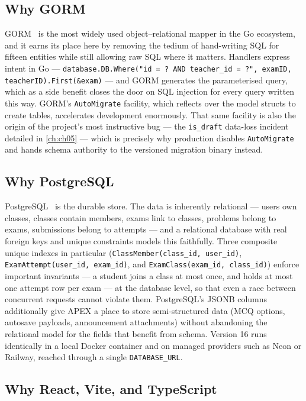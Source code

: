 \subsection{Why GORM}

GORM~\cite{gorm} is the most widely used object--relational mapper in the Go
ecosystem, and it earns its place here by removing the tedium of hand-writing
SQL for fifteen entities while still allowing raw SQL where it matters. Handlers
express intent in Go --- \texttt{database.DB.Where("id = ? AND teacher\_id = ?",
examID, teacherID).First(\&exam)} --- and GORM generates the parameterised
query, which as a side benefit closes the door on SQL injection for every
query written this way. GORM's \texttt{AutoMigrate} facility, which reflects
over the model structs to create tables, accelerates development enormously.
That same facility is also the origin of the project's most instructive bug ---
the \texttt{is\_draft} data-loss incident detailed in \cref{ch:ch05} --- which
is precisely why production disables \texttt{AutoMigrate} and hands schema
authority to the versioned migration binary instead.

\subsection{Why PostgreSQL}

PostgreSQL~\cite{postgres} is the durable store. The data is inherently
relational --- users own classes, classes contain members, exams link to
classes, problems belong to exams, submissions belong to attempts --- and a
relational database with real foreign keys and unique constraints models this
faithfully. Three composite unique indexes in particular
(\texttt{ClassMember(class\_id, user\_id)},
\texttt{ExamAttempt(user\_id, exam\_id)}, and
\texttt{ExamClass(exam\_id, class\_id)}) enforce important invariants --- a
student joins a class at most once, and holds at most one attempt row per exam
--- at the database level, so that even a race between concurrent requests
cannot violate them. PostgreSQL's JSONB columns additionally give APEX a place
to store semi-structured data (MCQ options, autosave payloads, announcement
attachments) without abandoning the relational model for the fields that
benefit from schema. Version 16 runs identically in a local Docker container
and on managed providers such as Neon or Railway, reached through a single
\texttt{DATABASE\_URL}.

\subsection{Why React, Vite, and TypeScript}

